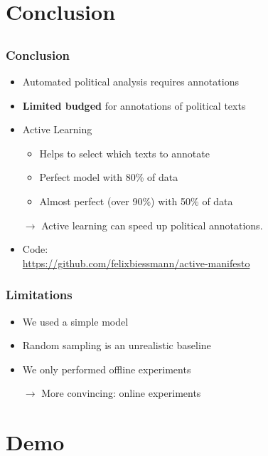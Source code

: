 \documentclass[]{beamer}
\begin{document}
\section{Conclusion}
\subsection{}


\begin{frame}\frametitle{Conclusion}
\begin{itemize}
\item Automated political analysis requires annotations
\item \textbf{Limited budged} for annotations of political texts 
\item Active Learning
\begin{itemize}
\item Helps to select which texts to annotate
\item Perfect model with 80\% of data
\item Almost perfect (over 90\%) with 50\% of data
\end{itemize}
\item[$\rightarrow$] Active learning can speed up political annotations. 
\item Code:\\
\footnotesize
 \url{https://github.com/felixbiessmann/active-manifesto} 
\end{itemize}
\end{frame}

\begin{frame}\frametitle{Limitations}
\begin{itemize}
\item We used a simple model
\item Random sampling is an unrealistic baseline
\item We only performed offline experiments
\item[$\rightarrow$] More convincing: online experiments
\end{itemize}
\end{frame}


\section{Demo}
\subsection{}
\end{document}

